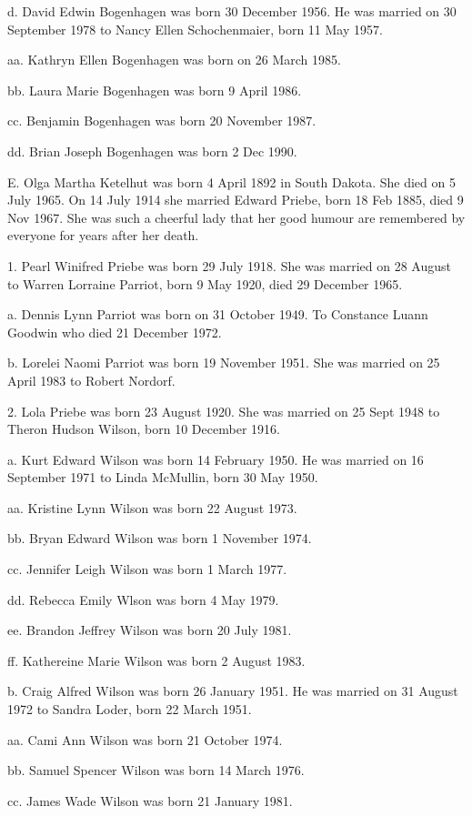 \documentclass[a4paper]{article}
\begin{document}
d. David Edwin Bogenhagen was born 30 December 1956.  He was married on 30 September 1978 to Nancy Ellen Schochenmaier, born 11 May 1957.

aa. Kathryn Ellen Bogenhagen was born on 26 March 1985.

bb. Laura Marie Bogenhagen was born 9 April 1986.

cc. Benjamin Bogenhagen was born 20 November 1987.

dd. Brian Joseph Bogenhagen was born 2 Dec 1990.
				
E. Olga Martha Ketelhut was born 4 April 1892 in South Dakota.  She died on 5 July 1965.   On 14 July 1914 she married Edward Priebe, born 18 Feb 1885, died 9 Nov 1967. She was such a cheerful lady that her good humour are remembered by everyone for years after her death.

1. Pearl Winifred Priebe was born 29 July 1918.  She was married on 28 August to Warren Lorraine Parriot, born 9 May 1920, died 29 December 1965.

a. Dennis Lynn Parriot was born on 31 October 1949.   To Constance Luann Goodwin who died 21 December  1972.

b. Lorelei  Naomi Parriot was born 19 November 1951.  She was married on 25 April 1983 to Robert Nordorf.

2. Lola Priebe was born 23 August 1920.  She was married on 25 Sept 1948 to Theron Hudson Wilson, born 10 December 1916.

a. Kurt Edward Wilson was born 14 February 1950.  He was married on 16 September 1971 to Linda McMullin, born 30 May 1950.

aa. Kristine Lynn Wilson was born 22 August 1973.

bb. Bryan Edward Wilson was born 1 November 1974.

cc. Jennifer Leigh Wilson was born 1 March 1977.

dd. Rebecca Emily Wlson was born 4 May 1979.

ee.  Brandon Jeffrey Wilson was born 20 July 1981.

ff.  Kathereine Marie Wilson was born 2 August 1983.  

b. Craig Alfred Wilson was born 26 January 1951.  He was married on 31 August 1972 to Sandra Loder, born 22 March 1951.

aa.  Cami Ann Wilson was born 21 October 1974.

bb. Samuel Spencer Wilson was born 14 March 1976.

cc. James Wade Wilson was born 21 January 1981.
\end{document}
